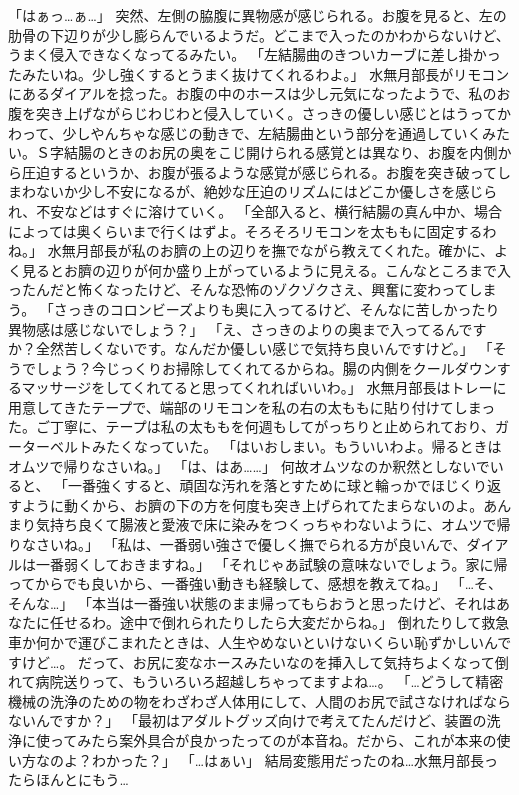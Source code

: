 「はぁっ…ぁ…」
突然、左側の脇腹に異物感が感じられる。お腹を見ると、左の肋骨の下辺りが少し膨らんでいるようだ。どこまで入ったのかわからないけど、うまく侵入できなくなってるみたい。
「左結腸曲のきついカーブに差し掛かったみたいね。少し強くするとうまく抜けてくれるわよ。」
水無月部長がリモコンにあるダイアルを捻った。お腹の中のホースは少し元気になったようで、私のお腹を突き上げながらじわじわと侵入していく。さっきの優しい感じとはうってかわって、少しやんちゃな感じの動きで、左結腸曲という部分を通過していくみたい。Ｓ字結腸のときのお尻の奥をこじ開けられる感覚とは異なり、お腹を内側から圧迫するというか、お腹が張るような感覚が感じられる。お腹を突き破ってしまわないか少し不安になるが、絶妙な圧迫のリズムにはどこか優しさを感じられ、不安などはすぐに溶けていく。
「全部入ると、横行結腸の真ん中か、場合によっては奥くらいまで行くはずよ。そろそろリモコンを太ももに固定するわね。」
水無月部長が私のお臍の上の辺りを撫でながら教えてくれた。確かに、よく見るとお臍の辺りが何か盛り上がっているように見える。こんなところまで入ったんだと怖くなったけど、そんな恐怖のゾクゾクさえ、興奮に変わってしまう。
「さっきのコロンビーズよりも奥に入ってるけど、そんなに苦しかったり異物感は感じないでしょう？」
「え、さっきのよりの奥まで入ってるんですか？全然苦しくないです。なんだか優しい感じで気持ち良いんですけど。」
「そうでしょう？今じっくりお掃除してくれてるからね。腸の内側をクールダウンするマッサージをしてくれてると思ってくれればいいわ。」
水無月部長はトレーに用意してきたテープで、端部のリモコンを私の右の太ももに貼り付けてしまった。ご丁寧に、テープは私の太ももを何週もしてがっちりと止められており、ガーターベルトみたくなっていた。
「はいおしまい。もういいわよ。帰るときはオムツで帰りなさいね。」
「は、はあ……」
何故オムツなのか釈然としないでいると、
「一番強くすると、頑固な汚れを落とすために球と輪っかでほじくり返すように動くから、お臍の下の方を何度も突き上げられてたまらないのよ。あんまり気持ち良くて腸液と愛液で床に染みをつくっちゃわないように、オムツで帰りなさいね。」
「私は、一番弱い強さで優しく撫でられる方が良いんで、ダイアルは一番弱くしておきますね。」
「それじゃあ試験の意味ないでしょう。家に帰ってからでも良いから、一番強い動きも経験して、感想を教えてね。」
「…そ、そんな…」
「本当は一番強い状態のまま帰ってもらおうと思ったけど、それはあなたに任せるわ。途中で倒れられたりしたら大変だからね。」
倒れたりして救急車か何かで運びこまれたときは、人生やめないといけないくらい恥ずかしいんですけど…。
だって、お尻に変なホースみたいなのを挿入して気持ちよくなって倒れて病院送りって、もういろいろ超越しちゃってますよね…。
「…どうして精密機械の洗浄のための物をわざわざ人体用にして、人間のお尻で試さなければならないんですか？」
「最初はアダルトグッズ向けで考えてたんだけど、装置の洗浄に使ってみたら案外具合が良かったってのが本音ね。だから、これが本来の使い方なのよ？わかった？」
「…はぁい」
結局変態用だったのね…水無月部長ったらほんとにもう…

